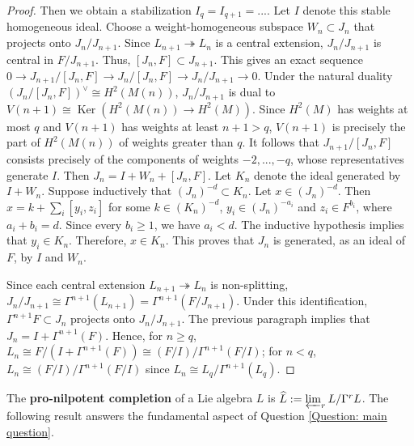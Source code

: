 \documentclass[11pt]{amsart}
\theoremstyle{definition}
\numberwithin{equation}{section}
\numberwithin{equation}{section}
\DeclareMathOperator{\Ker}{Ker}
\begin{document}
\begin{proof}
Then we obtain a stabilization $I_q=I_{q+1}=...$. Let $I$ denote this stable homogeneous ideal. Choose a weight-homogeneous subspace $W_n\subset J_n$ that projects onto $J_n/J_{n+1}$. Since $L_{n+1}\twoheadrightarrow L_n$ is a central extension, $J_n/J_{n+1}$ is central in $F/J_{n+1}$. Thus, $[J_n,F]\subset J_{n+1}$. This gives an exact sequence $0\rightarrow J_{n+1}/[J_n,F]\rightarrow J_n/[J_n,F]\rightarrow J_n/J_{n+1}\rightarrow 0$. Under the natural duality $(J_n/[J_n,F])^{\vee}\cong H^2(M(n))$, $J_n/J_{n+1}$ is dual to $V(n+1)\cong \Ker(H^2(M(n))\rightarrow H^2(M))$. Since $H^2(M)$ has weights at most $q$ and $V(n+1)$ has weights at least $n+1>q$, $V(n+1)$ is precisely the part of $H^2(M(n))$ of weights greater than $q$. It follows that $J_{n+1}/[J_n,F]$ consists precisely of the components of weights $-2,...,-q$, whose representatives generate $I$. Then $J_n=I+W_n+[J_n,F]$. Let $K_n$ denote the ideal generated by $I+W_n$. Suppose inductively that $(J_n)^{-d}\subset K_n$. Let $x\in (J_n)^{-d}$. Then $x=k+\sum_i[y_i,z_i]$ for some $k\in (K_n)^{-d}$, $y_i\in (J_n)^{-a_i}$ and $z_i \in F^{b_i}$, where $a_i+b_i=d$. Since every $b_i\geq 1$, we have $a_i<d$. The inductive hypothesis implies that $y_i\in K_n$. Therefore, $x\in K_n$. This proves that $J_n$ is generated, as an ideal of $F$, by $I$ and $W_n$.

Since each central extension $L_{n+1}\twoheadrightarrow L_n$ is non-splitting, $J_n/J_{n+1}\cong \Gamma^{n+1}(L_{n+1})=\Gamma^{n+1}(F/J_{n+1})$. 
Under this identification, $\Gamma^{n+1}F\subset J_{n}$ projects onto  $J_n/J_{n+1}$. The previous paragraph implies that $J_n=I+\Gamma^{n+1}(F)$. Hence, for $n\geq q$, $L_n\cong F/(I+\Gamma^{n+1}(F))\cong (F/I)/\Gamma^{n+1}(F/I)$; for $n<q$, $L_n\cong (F/I)/\Gamma^{n+1}(F/I)$ since $L_n\cong L_q/\Gamma^{n+1}(L_q)$.
\end{proof} 

The \textbf{pro-nilpotent completion} of a Lie algebra $L$ is  $\widehat{L}:=\varprojlim_r L/\Gamma^r L$. The following result answers the fundamental aspect of Question \ref{Question: main question}.
\end{document}

